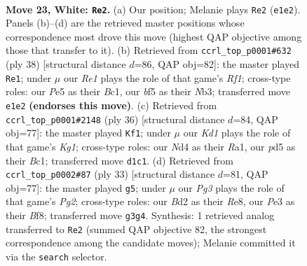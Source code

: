 \documentclass[11pt]{article}
\begin{document}
\clearpage

\begin{figure}[p]\centering
\begin{subfigure}{0.46\textwidth}\centering
\resizebox{\linewidth}{!}{%
\newchessgame
\chessboard[
  setfen={r2rn1k1/p1p1qp2/6p1/Q1PpPb1p/3N4/1P2P1P1/p2B1P1P/3KRBR1 w - - 3 23},
  showmover=false,
  pgfstyle=straightmove, color=movearrow, markmove={e1-e2}
]}
\caption{}
\end{subfigure}\hfill
\begin{subfigure}{0.46\textwidth}\centering
\resizebox{\linewidth}{!}{%
\newchessgame
\chessboard[
  setfen={k2r1b1r/1pq2pp1/p1n1p2p/3pP3/b2P3P/PNP2Q2/5PP1/1RBB1RK1 w - - 4 20},
  showmover=false,
  pgfstyle=straightmove, color=movearrow, markmove={f1-e1}
]}
\caption{}
\end{subfigure}
\\[4pt]
\begin{subfigure}{0.46\textwidth}\centering
\resizebox{\linewidth}{!}{%
\newchessgame
\chessboard[
  setfen={r3k2r/ppb2pp1/2pqp1n1/8/P2PQ2p/2PB3P/1P3PP1/R1B1R1K1 w kq - 1 19},
  showmover=false,
  pgfstyle=straightmove, color=movearrow, markmove={g1-f1}
]}
\caption{}
\end{subfigure}\hfill
\begin{subfigure}{0.46\textwidth}\centering
\resizebox{\linewidth}{!}{%
\newchessgame
\chessboard[
  setfen={2k1rb1r/1pp3p1/p1p1qp1n/7p/2N1PB2/2Q4P/PPP2PP1/R3R1K1 b - - 5 17},
  showmover=false,
  pgfstyle=straightmove, color=movearrow, markmove={g7-g5}
]}
\caption{}
\end{subfigure}
\caption{\textbf{Move 23, White: \texttt{Re2}.} (a) Our position; Melanie plays \texttt{Re2} (\texttt{e1e2}). Panels (b)--(d) are the retrieved master positions whose correspondence most drove this move (highest QAP objective among those that transfer to it). (b) Retrieved from \texttt{ccrl\_top\_p0001\#632} (ply 38) [structural distance $d$=86, QAP obj=82]: the master played \texttt{Re1}; under $\mu$ our \emph{Re1} plays the role of that game's \emph{Rf1}; cross-type roles: our \emph{P}e5 as their \emph{B}c1, our \emph{b}f5 as their \emph{N}b3; transferred move \texttt{e1e2} \textbf{(endorses this move)}. (c) Retrieved from \texttt{ccrl\_top\_p0001\#2148} (ply 36) [structural distance $d$=84, QAP obj=77]: the master played \texttt{Kf1}; under $\mu$ our \emph{Kd1} plays the role of that game's \emph{Kg1}; cross-type roles: our \emph{N}d4 as their \emph{R}a1, our \emph{p}d5 as their \emph{B}c1; transferred move \texttt{d1c1}. (d) Retrieved from \texttt{ccrl\_top\_p0002\#87} (ply 33) [structural distance $d$=81, QAP obj=77]: the master played \texttt{g5}; under $\mu$ our \emph{Pg3} plays the role of that game's \emph{Pg2}; cross-type roles: our \emph{B}d2 as their \emph{R}e8, our \emph{P}e3 as their \emph{B}f8; transferred move \texttt{g3g4}. Synthesis: 1 retrieved analog transferred to \texttt{Re2} (summed QAP objective 82, the strongest correspondence among the candidate moves); Melanie committed it via the \texttt{search} selector.}
\label{fig:thought-m44}
\end{figure}
\end{document}
